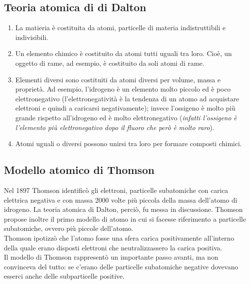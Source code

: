 \subsection{Teoria atomica di di Dalton}
\label{sec:dalton}
\begin{enumerate}
\item La matieria è costituita da atomi, particelle di materia indistruttibili e indivisibili.
\item Un elemento chimico è costituito da atomi tutti uguali tra loro. Cioè, un oggetto di rame, ad esempio,
  è costituito da soli atomi di rame. 
\item Elementi diversi sono costituiti da atomi diversi per volume, massa e proprietà. Ad esempio, l'idrogeno è un
  elemento molto piccolo ed è poco elettronegativo (l’elettronegatività è la tendenza di un atomo ad acquistare
  elettroni e quindi a caricarsi negativamente); invece l’ossigeno è molto più grande rispetto all’idrogeno ed è
  molto elettronegativo ({\it infatti l’ossigeno è l’elemento più elettronegativo dopo il fluoro che però è molto
    raro}).
\item Atomi uguali o diversi possono unirsi tra loro per formare composti chimici.
\end{enumerate}
\newpage
\subsection{Modello atomico di Thomson}
\label{sec:thomson}
\begin{defi}
  Nel 1897 Thomson identificò gli elettroni, particelle subatomiche con carica elettrica negativa e con massa 2000
volte più piccola della massa dell’atomo di idrogeno. La teoria atomica di Dalton, perciò, fu messa in discussione.
Thomson propose inoltre il primo modello di atomo in cui si facesse riferimento a particelle subatomiche, ovvero più
piccole dell’atomo.\\
Thomson ipotizzò che l'atomo fosse una sfera carica positivamente all'interno della quale erano disposti elettroni
che neutralizzassero la carica positiva.\\
Il modello di Thomson rappresentò un importante passo avanti, ma non convinceva del tutto: se c’erano delle
particelle subatomiche negative dovevano esserci anche delle subparticelle positive.
\end{defi}

